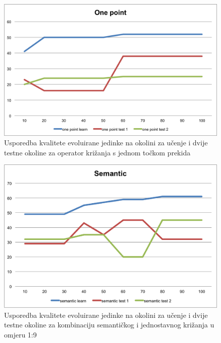 \begin{figure}[H]
	\centering
	\includegraphics[scale=0.8]{./slike/cross-validation/onepoint.png}
	\caption{Usporedba kvalitete evoluirane jedinke na okolini za učenje i dvije testne okoline za operator križanja s jednom točkom prekida}
	\label{onepoint}
\end{figure}

\begin{figure}[H]
	\centering
	\includegraphics[scale=0.8]{./slike/cross-validation/semantic.png}
	\caption{Usporedba kvalitete evoluirane jedinke na okolini za učenje i dvije testne okoline za kombinaciju semantičkog i jednostavnog križanja u omjeru 1:9}
	\label{semantic}
\end{figure}


